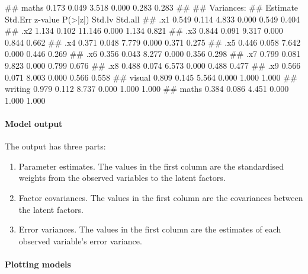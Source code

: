 \documentclass[]{article}
\newenvironment{Shaded}{\begin{snugshade}}{\end{snugshade}}
\newcommand{\NormalTok}[1]{#1}
\let\oldparagraph\paragraph
\renewcommand{\paragraph}[1]{\oldparagraph{#1}\mbox{}}
\theoremstyle{definition}
\theoremstyle{definition}
\theoremstyle{definition}
\theoremstyle{remark}
\begin{document}
\begin{Shaded}
\begin{Highlighting}[]
\NormalTok{##     maths             0.173    0.049    3.518    0.000    0.283    0.283}
\NormalTok{## }
\NormalTok{## Variances:}
\NormalTok{##                    Estimate  Std.Err  z-value  P(>|z|)   Std.lv  Std.all}
\NormalTok{##    .x1                0.549    0.114    4.833    0.000    0.549    0.404}
\NormalTok{##    .x2                1.134    0.102   11.146    0.000    1.134    0.821}
\NormalTok{##    .x3                0.844    0.091    9.317    0.000    0.844    0.662}
\NormalTok{##    .x4                0.371    0.048    7.779    0.000    0.371    0.275}
\NormalTok{##    .x5                0.446    0.058    7.642    0.000    0.446    0.269}
\NormalTok{##    .x6                0.356    0.043    8.277    0.000    0.356    0.298}
\NormalTok{##    .x7                0.799    0.081    9.823    0.000    0.799    0.676}
\NormalTok{##    .x8                0.488    0.074    6.573    0.000    0.488    0.477}
\NormalTok{##    .x9                0.566    0.071    8.003    0.000    0.566    0.558}
\NormalTok{##     visual            0.809    0.145    5.564    0.000    1.000    1.000}
\NormalTok{##     writing           0.979    0.112    8.737    0.000    1.000    1.000}
\NormalTok{##     maths             0.384    0.086    4.451    0.000    1.000    1.000}
\end{Highlighting}
\end{Shaded}

\paragraph{Model output}\label{model-output}

The output has three parts:

\begin{enumerate}
\def\labelenumi{\arabic{enumi}.}
\item
  Parameter estimates. The values in the first column are the
  standardised weights from the observed variables to the latent
  factors.
\item
  Factor covariances. The values in the first column are the covariances
  between the latent factors.
\item
  Error variances. The values in the first column are the estimates of
  each observed variable's error variance.
\end{enumerate}

\paragraph{Plotting models}\label{plotting-models}
\end{document}

